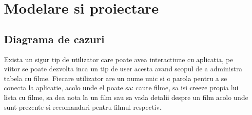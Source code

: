 \chapter{Modelare si proiectare}

\section{Diagrama de cazuri}
\label{sec:ch3sec1}
 \par Exista un sigur tip de utilizator care poate avea interactiune cu aplicatia, pe viitor se poate dezvolta inca un tip de user acesta avand scopul de a administra tabela cu filme. Fiecare utilizator are un nume unic si o parola pentru a se conecta la aplicatie, acolo unde el poate sa: caute filme, sa isi creeze propia lui lista cu filme, sa dea nota la un film sau sa vada detalii despre un film acolo unde sunt prezente si recomandari pentru filmul respectiv.




